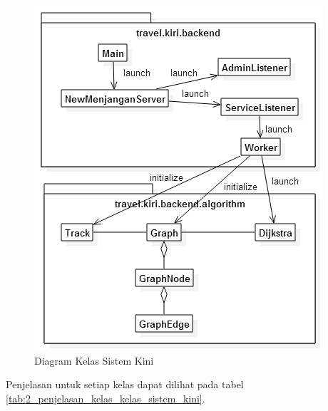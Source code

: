 \begin{figure}
	\centering
	\includegraphics[scale=0.5]{Gambar/2_diagram_kelas_sistem_kini}
	\caption{Diagram Kelas Sistem Kini} 
	\label{fig:2_diagram_kelas_sistem_kini}
\end{figure}

Penjelasan untuk setiap kelas dapat dilihat pada tabel \ref{tab:2_penjelasan_kelas_kelas_sistem_kini}.

